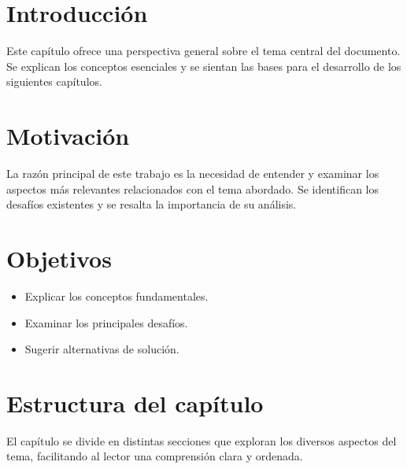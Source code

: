 \section{Introducción}

Este capítulo ofrece una perspectiva general sobre el tema central del documento. Se explican los conceptos esenciales y se sientan las bases para el desarrollo de los siguientes capítulos.

\section{Motivación}

La razón principal de este trabajo es la necesidad de entender y examinar los aspectos más relevantes relacionados con el tema abordado. Se identifican los desafíos existentes y se resalta la importancia de su análisis.

\section{Objetivos}

\begin{itemize}
    \item Explicar los conceptos fundamentales.
    \item Examinar los principales desafíos.
    \item Sugerir alternativas de solución.
\end{itemize}

\section{Estructura del capítulo}

El capítulo se divide en distintas secciones que exploran los diversos aspectos del tema, facilitando al lector una comprensión clara y ordenada.